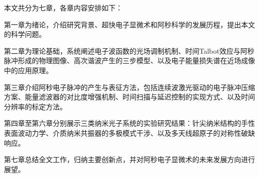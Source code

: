 本文共分为七章，各章内容安排如下：

第一章为绪论，介绍研究背景、超快电子显微术和阿秒科学的发展历程，提出本文的科学问题。

第二章为理论基础，系统阐述电子波函数的光场调制机制、时间Talbot效应与阿秒脉冲形成的物理图像、高次谐波产生的三步模型、以及电子能量损失谱在近场成像中的应用原理。

第三章介绍阿秒电子脉冲的产生与表征方法，包括连续波激光驱动的电子脉冲压缩方案、能量滤波器的对比度增强机制、时间扫描与延迟控制的实现方式、以及时间分辨率的标定方法。

第四章至第六章分别展示三类纳米光子系统的实验研究结果：针尖纳米结构的手性表面波动力学、介质纳米共振器的多极模式干涉、以及多天线超原子的对称性破缺响应。

第七章总结全文工作，归纳主要创新点，并对阿秒电子显微术的未来发展方向进行展望。
